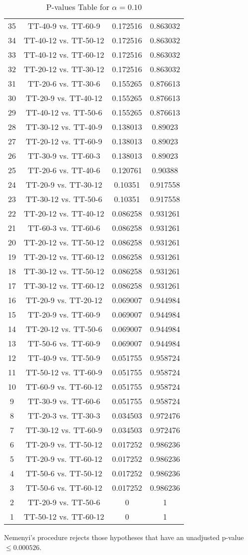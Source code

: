 \documentclass[a4paper,10pt]{article}
\begin{document}
\begin{landscape}
\begin{table}[!htp]
\begin{tabular}{cccc}
35&TT-40-9 vs. TT-60-9&0.172516&0.863032\\
34&TT-40-12 vs. TT-50-12&0.172516&0.863032\\
33&TT-40-12 vs. TT-60-12&0.172516&0.863032\\
32&TT-20-12 vs. TT-30-12&0.172516&0.863032\\
31&TT-20-6 vs. TT-30-6&0.155265&0.876613\\
30&TT-20-9 vs. TT-40-12&0.155265&0.876613\\
29&TT-40-12 vs. TT-50-6&0.155265&0.876613\\
28&TT-30-12 vs. TT-40-9&0.138013&0.89023\\
27&TT-20-12 vs. TT-60-9&0.138013&0.89023\\
26&TT-30-9 vs. TT-60-3&0.138013&0.89023\\
25&TT-20-6 vs. TT-40-6&0.120761&0.90388\\
24&TT-20-9 vs. TT-30-12&0.10351&0.917558\\
23&TT-30-12 vs. TT-50-6&0.10351&0.917558\\
22&TT-20-12 vs. TT-40-12&0.086258&0.931261\\
21&TT-60-3 vs. TT-60-6&0.086258&0.931261\\
20&TT-20-12 vs. TT-50-12&0.086258&0.931261\\
19&TT-20-12 vs. TT-60-12&0.086258&0.931261\\
18&TT-30-12 vs. TT-50-12&0.086258&0.931261\\
17&TT-30-12 vs. TT-60-12&0.086258&0.931261\\
16&TT-20-9 vs. TT-20-12&0.069007&0.944984\\
15&TT-20-9 vs. TT-60-9&0.069007&0.944984\\
14&TT-20-12 vs. TT-50-6&0.069007&0.944984\\
13&TT-50-6 vs. TT-60-9&0.069007&0.944984\\
12&TT-40-9 vs. TT-50-9&0.051755&0.958724\\
11&TT-50-12 vs. TT-60-9&0.051755&0.958724\\
10&TT-60-9 vs. TT-60-12&0.051755&0.958724\\
9&TT-30-9 vs. TT-60-6&0.051755&0.958724\\
8&TT-20-3 vs. TT-30-3&0.034503&0.972476\\
7&TT-30-12 vs. TT-60-9&0.034503&0.972476\\
6&TT-20-9 vs. TT-50-12&0.017252&0.986236\\
5&TT-20-9 vs. TT-60-12&0.017252&0.986236\\
4&TT-50-6 vs. TT-50-12&0.017252&0.986236\\
3&TT-50-6 vs. TT-60-12&0.017252&0.986236\\
2&TT-20-9 vs. TT-50-6&0&1\\
1&TT-50-12 vs. TT-60-12&0&1\\
\hline
\end{tabular}
\caption{P-values Table for $\alpha=0.10$}
\end{table}Nemenyi's procedure rejects those hypotheses that have an unadjusted p-value $\le0.000526$.


\end{landscape}
\end{document}
